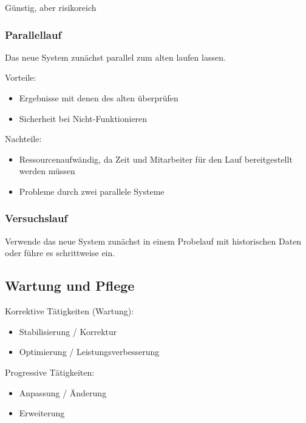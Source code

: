 Günstig, aber risikoreich

\subsubsection{Parallellauf}
Das neue System zunächst parallel zum alten laufen lassen.

Vorteile:
\begin{itemize}
    \item Ergebnisse mit denen des alten überprüfen
    \item Sicherheit bei Nicht-Funktionieren
\end{itemize}

Nachteile:
\begin{itemize}
    \item Ressourcenaufwändig, da Zeit und Mitarbeiter für den Lauf bereitgestellt werden müssen
    \item Probleme durch zwei parallele Systeme
\end{itemize}

\subsubsection{Versuchslauf}
Verwende das neue System zunächst in einem Probelauf mit historischen Daten oder führe es schrittweise ein.

\subsection{Wartung und Pflege}
Korrektive Tätigkeiten (Wartung):
\begin{itemize}
    \item Stabilisierung / Korrektur
    \item Optimierung / Leistungsverbesserung
\end{itemize}

Progressive Tätigkeiten:
\begin{itemize}
    \item Anpassung / Änderung
    \item Erweiterung
\end{itemize}